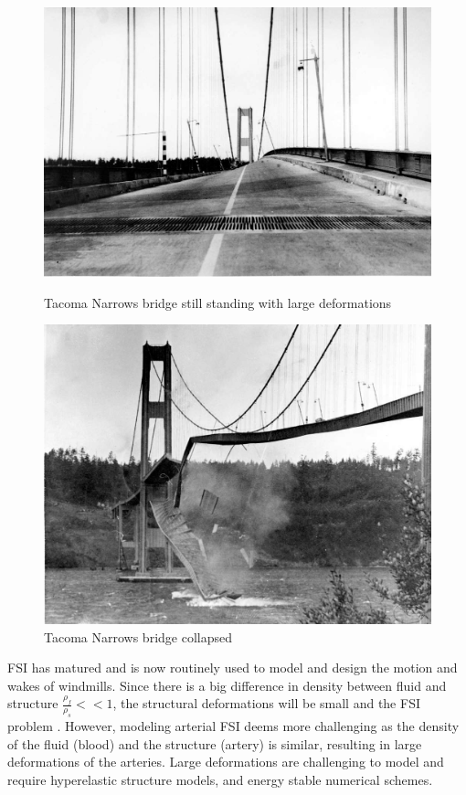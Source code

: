 \begin{figure}
\centering
\begin{minipage}{.51\textwidth}
  \centering
  \includegraphics[width=.95\linewidth]{./IntroductionToFSI/tacoma2.jpeg}
  \caption{Tacoma Narrows bridge still standing with large deformations}
  \label{fig:test1}
\end{minipage}%
\begin{minipage}{.50\textwidth}
  \centering
  \includegraphics[width=.95\linewidth]{./IntroductionToFSI/tacoma3.jpeg}
  \caption{Tacoma Narrows bridge collapsed}
  \label{fig:test2}
\end{minipage}
\end{figure}

FSI has matured and is now routinely used to model and design the motion and wakes of windmills.
Since there is a big difference in density between fluid and structure $\frac{\rho_f}{\rho_s} << 1$, the structural deformations will be small and the FSI problem . However, modeling arterial FSI deems more challenging as the density of the fluid (blood) and the structure (artery) is similar, resulting in large deformations of the arteries. Large deformations are challenging to model and require hyperelastic structure models, and energy stable numerical schemes.\newline

